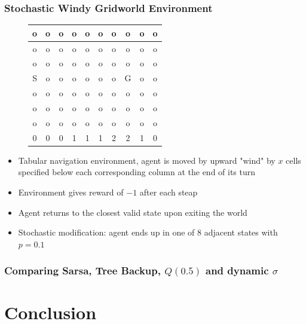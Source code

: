\documentclass{beamer}
\begin{document}
\begin{frame}
  \frametitle{Stochastic Windy Gridworld Environment}
  \begin{figure}
    \centering
    \begin{tabular}{ | c | c | c | c | c | c | c | c | c | c | }
      \hline
      o & o & o & o & o & o & o & o & o & o\\ \hline
      o & o & o & o & o & o & o & o & o & o\\ \hline
      o & o & o & o & o & o & o & o & o & o\\ \hline
      S & o & o & o & o & o & o & G & o & o\\ \hline
      o & o & o & o & o & o & o & o & o & o\\ \hline
      o & o & o & o & o & o & o & o & o & o\\ \hline
      o & o & o & o & o & o & o & o & o & o\\ \hline
      0 & 0 & 0 & 1 & 1 & 1 & 2 & 2 & 1 & 0\\ \hline
    \end{tabular}
  \end{figure}
  \begin{itemize}
    \item Tabular navigation environment, agent is moved by upward "wind" by $x$
      cells specified below each corresponding column at the end of its turn
    \item Environment gives reward of $-1$ after each steap
    \item Agent returns to the closest valid state upon exiting the world
    \item Stochastic modification: agent ends up in one of 8 adjacent states
      with $p = 0.1$
  \end{itemize}
\end{frame}

\begin{frame}
  \frametitle{Comparing Sarsa, Tree Backup, $Q(0.5)$ and dynamic $\sigma$}
\end{frame}

\section{Conclusion}
\end{document}
